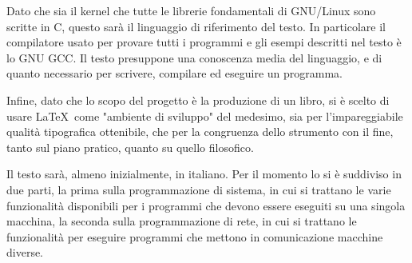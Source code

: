 Dato che sia il kernel che tutte le librerie fondamentali di GNU/Linux sono
scritte in C, questo sarà il linguaggio di riferimento del testo. In
particolare il compilatore usato per provare tutti i programmi e gli esempi
descritti nel testo è lo GNU GCC. Il testo presuppone una conoscenza media del
linguaggio, e di quanto necessario per scrivere, compilare ed eseguire un
programma.

Infine, dato che lo scopo del progetto è la produzione di un libro, si è
scelto di usare \LaTeX\ come "ambiente di sviluppo" del medesimo, sia per
l'impareggiabile qualità tipografica ottenibile, che per la congruenza dello
strumento con il fine, tanto sul piano pratico, quanto su quello filosofico.

Il testo sarà, almeno inizialmente, in italiano. Per il momento lo si è
suddiviso in due parti, la prima sulla programmazione di sistema, in cui si
trattano le varie funzionalità disponibili per i programmi che devono essere
eseguiti su una singola macchina, la seconda sulla programmazione di rete, in
cui si trattano le funzionalità per eseguire programmi che mettono in
comunicazione macchine diverse.




